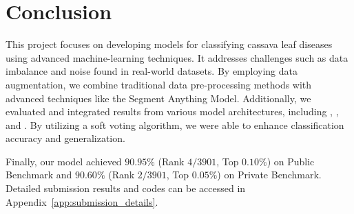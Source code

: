 \section{Conclusion}

This project focuses on developing models for classifying cassava leaf diseases using advanced machine-learning techniques. It addresses challenges such as data imbalance and noise found in real-world datasets. By employing data augmentation, we combine traditional data pre-processing methods with advanced techniques like the Segment Anything Model. Additionally, we evaluated and integrated results from various model architectures, including \VIT, \CONV, and \CROP. By utilizing a soft voting algorithm, we were able to enhance classification accuracy and generalization.

Finally, our model achieved $90.95\%$ (Rank $4 / 3901$, Top $0.10\%$) on Public Benchmark and $90.60\%$ (Rank $2 / 3901$, Top $0.05\%$) on Private Benchmark. Detailed submission results and codes can be accessed in Appendix~\ref{app:submission_details}.
